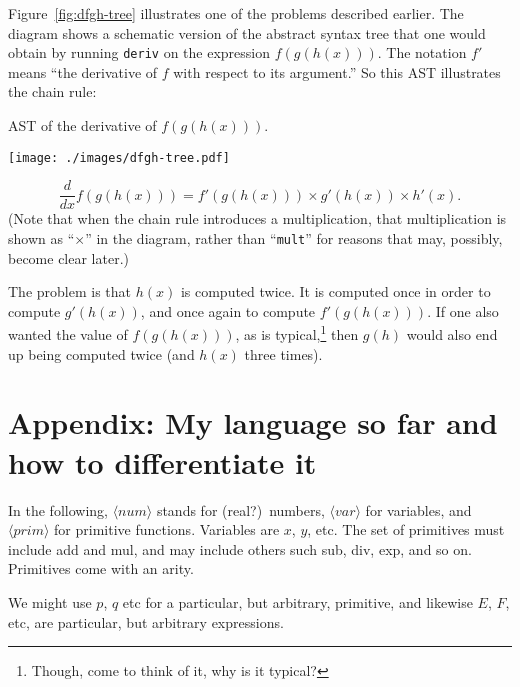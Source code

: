 \documentclass[11pt, a4paper]{article}
\newcommand{\cd}[1]{\texttt{#1}}
\begin{document}
Figure~\ref{fig:dfgh-tree} illustrates one of the problems described
earlier. The diagram shows a schematic version of the abstract syntax
tree that one would obtain by running \cd{deriv} on the expression
$f(g(h(x)))$. The notation $f'$ means ``the derivative of $f$ with
respect to its argument.'' So this AST illustrates the chain rule:
\begin{marginfigure}
  \caption{AST of the derivative of $f(g(h(x)))$.\label{fig:dfgh-tree}}
  \texttt{[image: ./images/dfgh-tree.pdf]}
\end{marginfigure}
\begin{equation*}
  \frac{d}{dx} f(g(h(x))) = f'(g(h(x))) \times g'(h(x)) \times h'(x).
\end{equation*}
(Note that when the chain rule introduces a multiplication, that
multiplication is shown as ``$\times$'' in the diagram, rather than
``\cd{mult}'' for reasons that may, possibly, become clear later.)

The problem is that $h(x)$ is computed twice. It is computed once in
order to compute $g'(h(x))$, and once again to compute
$f'(g(h(x)))$. If one also wanted the value of $f(g(h(x)))$, as is
typical,\footnote{Though, come to think of it, why is it typical?}
then $g(h)$ would also end up being computed twice (and $h(x)$ three
times).


\section{Appendix: My language so far and how to differentiate it}

\newcommand{\nonterminal}[1]{\langle\textit{#1}\rangle}
\newcommand{\num}{\nonterminal{num}}
\newcommand{\var}{\nonterminal{var}}
\newcommand{\prim}{\nonterminal{prim}}
\newcommand{\expr}{\nonterminal{expr}}
\newcommand{\terminal}[1]{\texttt{#1}}
\newcommand{\proc}[1]{\terminal{#1}}
\newcommand{\Tlt}{\proc{let}}
\newcommand{\Teq}{\proc{=}}
\newcommand{\Tin}{\proc{in}}
\newcommand{\mklet}[3]{\Tlt\;#1\;\Teq\;#2\;\Tin\;#3}

In the following, $\num$ stands for (real?)\ numbers, $\var$ for
variables, and $\prim$ for primitive functions. Variables are $x$,
$y$, etc. The set of primitives must include add and mul, and may
include others such sub, div, exp, and so on. Primitives come with an
arity.

We might use $p$, $q$ etc for a particular, but arbitrary, primitive,
and likewise $E$, $F$, etc, are particular, but arbitrary expressions.
\end{document}
